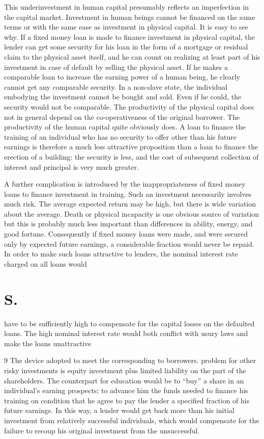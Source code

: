 \documentclass[11pt,openany]{book}
\newcommand{\booksection}[1]{%
  \phantomsection\section*{#1}%
  \addcontentsline{toc}{section}{#1}\markright{#1}}
\begin{document}
This underinvestment in human capital presumably reflects an imperfection in the capital market. Investment in human beings cannot be financed on the same terms or with the same ease as investment in physical capital. It is easy to see why. If a fixed money loan is made to finance investment in physical capital, the lender can get some security for his loan in the form of a mortgage or residual claim to the physical asset itself, and he can count on realizing at least part of his investment in case of default by selling the physical asset. If he makes a comparable loan to increase the earning power of a human being, he clearly cannot get any comparable security. In a non-slave state, the individual embodying the investment cannot be bought and sold. Even if he could, the security would not be comparable. The productivity of the physical capital does not in general depend on the co-operativeness of the original borrower. The productivity of the human capital quite obviously does. A loan to finance the training of an individual who has no security to offer other than his future earnings is therefore a much less attractive proposition than a loan to finance the erection of a building: the security is less, and the cost of subsequent collection of interest and principal is very much greater.

A further complication is introduced by the inappropriateness of fixed money loans to finance investment in training. Such an investment necessarily involves much risk. The average expected return may be high, but there is wide variation about the average. Death or physical incapacity is one obvious source of variation but this is probably much less important than differences in ability, energy, and good fortune. Consequently if fixed money loans were made, and were secured only by expected future earnings, a considerable fraction would never be repaid. In order to make such loans attractive to lenders, the nominal interest rate charged on all loans would

\booksection{S.}

have to be sufficiently high to compensate for the capital losses on the defaulted loans. The high nominal interest rate would both conflict with usury laws and make the loans unattractive

9 The device adopted to meet the corresponding to borrowers. problem for other risky investments is equity investment plus limited liability on the part of the shareholders. The counterpart for education would be to ``buy'' a share in an individual's earning prospects; to advance him the funds needed to finance his training on condition that he agree to pay the lender a specified fraction of his future earnings. In this way, a lender would get back more than his initial investment from relatively successful individuals, which would compensate for the failure to recoup his original investment from the unsuccessful.
\end{document}
